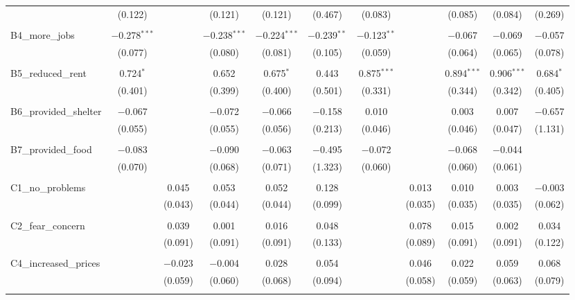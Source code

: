 \begin{table}[H]
\begin{tabular}{@{\extracolsep{4pt}}lcccccccccc}
  & (0.122) &  & (0.121) & (0.121) & (0.467) & (0.083) &  & (0.085) & (0.084) & (0.269) \\ 
  & & & & & & & & & & \\ 
 B4\_more\_jobs & $-$0.278$^{***}$ &  & $-$0.238$^{***}$ & $-$0.224$^{***}$ & $-$0.239$^{**}$ & $-$0.123$^{**}$ &  & $-$0.067 & $-$0.069 & $-$0.057 \\ 
  & (0.077) &  & (0.080) & (0.081) & (0.105) & (0.059) &  & (0.064) & (0.065) & (0.078) \\ 
  & & & & & & & & & & \\ 
 B5\_reduced\_rent & 0.724$^{*}$ &  & 0.652 & 0.675$^{*}$ & 0.443 & 0.875$^{***}$ &  & 0.894$^{***}$ & 0.906$^{***}$ & 0.684$^{*}$ \\ 
  & (0.401) &  & (0.399) & (0.400) & (0.501) & (0.331) &  & (0.344) & (0.342) & (0.405) \\ 
  & & & & & & & & & & \\ 
 B6\_provided\_shelter & $-$0.067 &  & $-$0.072 & $-$0.066 & $-$0.158 & 0.010 &  & 0.003 & 0.007 & $-$0.657 \\ 
  & (0.055) &  & (0.055) & (0.056) & (0.213) & (0.046) &  & (0.046) & (0.047) & (1.131) \\ 
  & & & & & & & & & & \\ 
 B7\_provided\_food & $-$0.083 &  & $-$0.090 & $-$0.063 & $-$0.495 & $-$0.072 &  & $-$0.068 & $-$0.044 &  \\ 
  & (0.070) &  & (0.068) & (0.071) & (1.323) & (0.060) &  & (0.060) & (0.061) &  \\ 
  & & & & & & & & & & \\ 
 C1\_no\_problems &  & 0.045 & 0.053 & 0.052 & 0.128 &  & 0.013 & 0.010 & 0.003 & $-$0.003 \\ 
  &  & (0.043) & (0.044) & (0.044) & (0.099) &  & (0.035) & (0.035) & (0.035) & (0.062) \\ 
  & & & & & & & & & & \\ 
 C2\_fear\_concern &  & 0.039 & 0.001 & 0.016 & 0.048 &  & 0.078 & 0.015 & 0.002 & 0.034 \\ 
  &  & (0.091) & (0.091) & (0.091) & (0.133) &  & (0.089) & (0.091) & (0.091) & (0.122) \\ 
  & & & & & & & & & & \\ 
 C4\_increased\_prices &  & $-$0.023 & $-$0.004 & 0.028 & 0.054 &  & 0.046 & 0.022 & 0.059 & 0.068 \\ 
  &  & (0.059) & (0.060) & (0.068) & (0.094) &  & (0.058) & (0.059) & (0.063) & (0.079) \\ 
  & & & & & & & & & & \\ 

\end{tabular}
\end{table}
